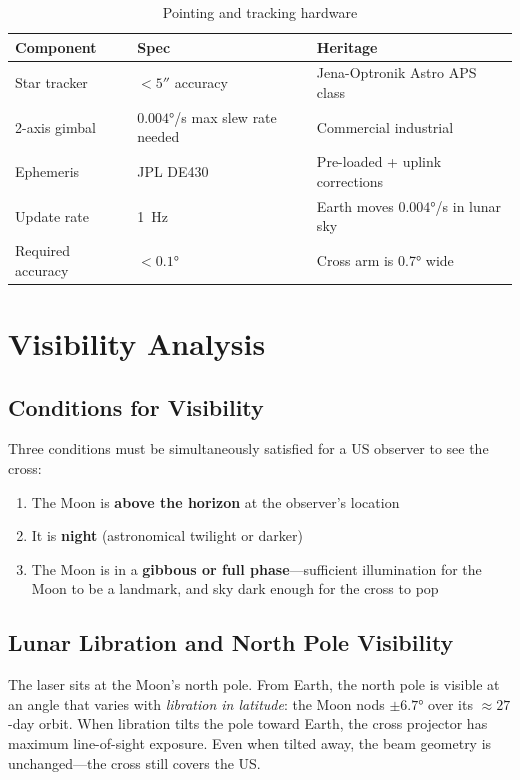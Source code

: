 \documentclass[10pt,letterpaper]{article}
\begin{document}
\begin{table}[!ht]
\centering\small
\caption{Pointing and tracking hardware}
\label{tab:pointing}
\begin{tabularx}{\linewidth}{llX}
\toprule
\textbf{Component} & \textbf{Spec} & \textbf{Heritage} \\
\midrule
Star tracker & $< \ang{;;5}$ accuracy & Jena-Optronik Astro APS class \\
2-axis gimbal & $\ang{0.004}$/s max slew rate needed & Commercial industrial \\
Ephemeris & JPL DE430 & Pre-loaded + uplink corrections \\
Update rate & \SI{1}{\hertz} & Earth moves $\ang{0.004}$/s in lunar sky \\
Required accuracy & $< \ang{0.1}$ & Cross arm is \ang{0.7} wide \\
\bottomrule
\end{tabularx}
\end{table}

\section{Visibility Analysis}

\subsection{Conditions for Visibility}

Three conditions must be simultaneously satisfied for a US observer to see the
cross:
\begin{enumerate}
  \item The Moon is \textbf{above the horizon} at the observer's location
  \item It is \textbf{night} (astronomical twilight or darker)
  \item The Moon is in a \textbf{gibbous or full phase}---sufficient illumination
        for the Moon to be a landmark, and sky dark enough for the cross to pop
\end{enumerate}

\subsection{Lunar Libration and North Pole Visibility}

The laser sits at the Moon's north pole. From Earth, the north pole is visible
at an angle that varies with \emph{libration in latitude}: the Moon nods
$\pm\ang{6.7}$ over its $\approx 27$-day orbit. When libration tilts the pole
toward Earth, the cross projector has maximum line-of-sight exposure. Even when
tilted away, the beam geometry is unchanged---the cross still covers the US.
\end{document}
